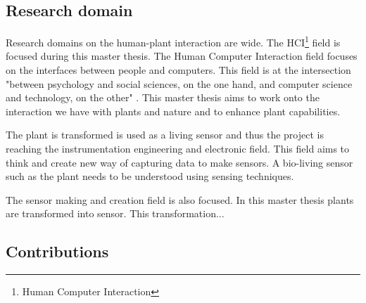 \subsection{Research domain}

Research domains on the human-plant interaction are wide. The HCI\footnote{Human Computer Interaction} field is focused
during this master thesis. The Human Computer Interaction field focuses on the interfaces between people and computers.
This field is at the intersection "between psychology and social sciences, on the one hand, and computer science and technology,
on the other" \cite{carrollHUMANCOMPUTERINTERACTIONPsychology}. This master thesis aims to work onto the interaction
we have with plants and nature and to enhance plant capabilities.

The plant is transformed is used as a living sensor and thus the project is reaching the instrumentation engineering 
and electronic field. This field aims to think and create new way of capturing data to make sensors.
A bio-living sensor such as the plant needs to be understood using sensing techniques.

The sensor making and creation field is also focused. In this master thesis plants are transformed into sensor.
This transformation...


\subsection{Contributions}
